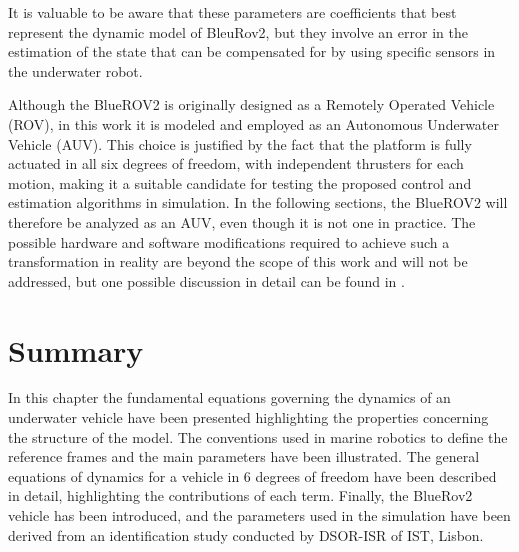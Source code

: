 It is valuable to be aware that these parameters are coefficients that best represent the dynamic model of BleuRov2, but they involve an error in the estimation of the state that can be compensated for by using specific sensors in the underwater robot.

Although the BlueROV2 is originally designed as a Remotely Operated Vehicle (ROV), in this work it is modeled and employed as an Autonomous Underwater Vehicle (AUV). 
This choice is justified by the fact that the platform is fully actuated in all six degrees of freedom, with independent thrusters for each motion, making it a 
suitable candidate for testing the proposed control and estimation algorithms in simulation. In the following sections, the BlueROV2 will therefore be analyzed as 
an AUV, even though it is not one in practice. The possible hardware and software modifications required to achieve such a transformation in reality are beyond the 
scope of this work and will not be addressed, but one possible discussion in detail can be found in \cite{willnersMarketreadyROVsLowcost2021}.

\section{Summary}
In this chapter the fundamental equations governing the dynamics of an underwater vehicle have been presented highlighting the properties concerning the structure of the model. The conventions used in marine robotics to define
the reference frames and the main parameters have been illustrated. The general equations of dynamics for a vehicle in 6 degrees of freedom have been described
in detail, highlighting the contributions of each term. Finally, the BlueRov2 vehicle has been introduced, and the parameters used in the simulation have been 
derived from an identification study conducted by DSOR-ISR of IST, Lisbon.



